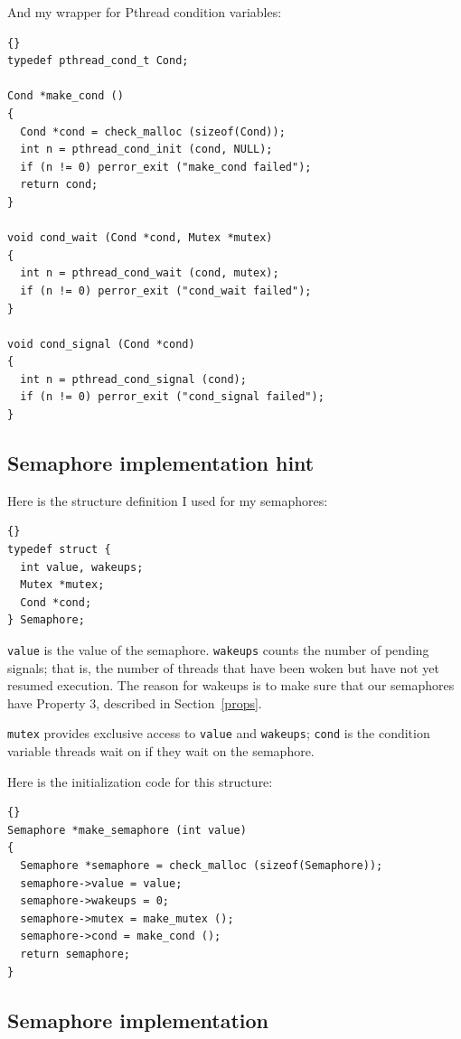 \documentclass{book}
\newcommand{\clearemptydoublepage}{\newpage\cleardoublepage}
\begin{document}
\newpage
And my wrapper for Pthread condition variables:

\begin{lstlisting}[title={}]{}
typedef pthread_cond_t Cond;

Cond *make_cond ()
{
  Cond *cond = check_malloc (sizeof(Cond)); 
  int n = pthread_cond_init (cond, NULL);
  if (n != 0) perror_exit ("make_cond failed");
  return cond;
}

void cond_wait (Cond *cond, Mutex *mutex)
{
  int n = pthread_cond_wait (cond, mutex);
  if (n != 0) perror_exit ("cond_wait failed");
}

void cond_signal (Cond *cond)
{
  int n = pthread_cond_signal (cond);
  if (n != 0) perror_exit ("cond_signal failed");
}
\end{lstlisting}



\clearemptydoublepage
\subsection{Semaphore implementation hint}

Here is the structure definition I used for my semaphores:

\begin{lstlisting}[title={}]{}
typedef struct {
  int value, wakeups;
  Mutex *mutex;
  Cond *cond;
} Semaphore;
\end{lstlisting}

{\tt value} is the value of the semaphore.  {\tt wakeups} counts
the number of pending signals; that is, the number of threads
that have been woken but have not yet resumed execution.  The reason
for wakeups is to make sure that our semaphores have
Property 3, described in Section~\ref{props}.

{\tt mutex} provides exclusive access to {\tt value} and
{\tt wakeups}; {\tt cond} is the condition variable threads
wait on if they wait on the semaphore.

Here is the initialization code for this structure:

\begin{lstlisting}[title={}]{}
Semaphore *make_semaphore (int value)
{
  Semaphore *semaphore = check_malloc (sizeof(Semaphore));
  semaphore->value = value;
  semaphore->wakeups = 0;
  semaphore->mutex = make_mutex ();
  semaphore->cond = make_cond ();
  return semaphore;
}
\end{lstlisting}


\clearemptydoublepage
\subsection{Semaphore implementation}
\end{document}
